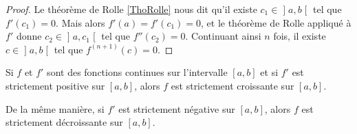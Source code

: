\begin{proof}
	Le théorème de Rolle \ref{ThoRolle} nous dit qu'il existe \( c_1\in \mathopen] a , b \mathclose[\) tel que \( f'(c_1)=0\). Mais alors \( f'(a)=f'(c_1)=0\), et le théorème de Rolle appliqué à \( f'\) donne \( c_2\in \mathopen] a , c_1 \mathclose[\) tel que \( f''(c_2)=0\). Continuant ainsi \( n\) fois, il existe \( c\in \mathopen] a ,b\mathclose[\) tel que \( f^{(n+1)}(c)=0\).
\end{proof}



\begin{proposition} \label{PropGFkZMwD}
	Si \( f\) et \( f'\) sont des fonctions continues sur l'intervalle \( [a,b]\) et si \( f'\) est strictement positive sur \( [a,b]\), alors \( f\) est strictement croissante sur \( [a,b]\).

	De la même manière, si \( f'\) est strictement négative sur \( [a,b]\), alors \( f\) est strictement décroissante sur \( [a,b]\).
\end{proposition}

